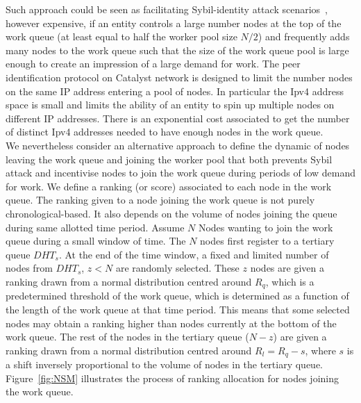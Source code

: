 Such approach could be seen as facilitating Sybil-identity attack scenarios~\cite{sybil}, however expensive, if an entity controls a large number nodes at the top of the work queue (at least equal to half the worker pool size $N/2$) and frequently adds many nodes to the work queue such that the size of the work queue pool is large enough to create an impression of a large demand for work. The peer identification protocol on Catalyst network is designed to limit the number nodes on the same IP address entering a pool of nodes. In particular the Ipv4 address space is small and limits the ability of an entity to spin up multiple nodes on different IP addresses. There is an exponential cost associated to get the number of distinct Ipv4 addresses needed to have enough nodes in the work queue. \\

We nevertheless consider an alternative approach to define the dynamic of nodes leaving the work queue and joining the worker pool that both prevents Sybil attack and incentivise nodes to join the work queue during periods of low demand for work. We define a ranking (or score) associated to each node in the work queue. The ranking given to a node joining the work queue is not purely chronological-based. It also depends on the volume of nodes joining the queue during same allotted time period. Assume $N$ Nodes wanting to join the work queue during a small window of time. The $N$ nodes first register to a tertiary queue $DHT_s$. At the end of the time window, a fixed and limited number of nodes from $DHT_s$, $z < N$ are randomly selected. These $z$ nodes are given a ranking drawn from a normal distribution centred around $R_q$, which is a predetermined threshold of the work queue, which is determined as a function of the length of the work queue at that time period. This means that some selected nodes may obtain a ranking higher than nodes currently at the bottom of the work queue. The rest of the nodes in the tertiary queue ($N-z$) are given a ranking drawn from a normal distribution centred around $R_l = R_q - s$, where $s$ is a shift inversely proportional to the volume of nodes in the tertiary queue. Figure~\ref{fig:NSM} illustrates the process of ranking allocation for nodes joining the work queue. 

